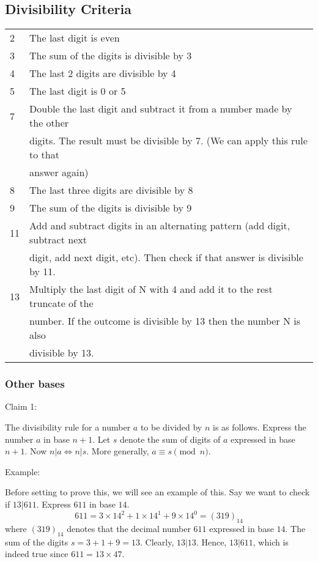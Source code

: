 \subsection{Divisibility Criteria}

\begin{table}[]
  \begin{tabular}{ll}
    2  & The last digit is even \\
    3  & The sum of the digits is divisible by 3 \\
    4  & The last 2 digits are divisible by 4 \\
    5  & The last digit is 0 or 5 \\
    7  & Double the last digit and subtract it from a number made by the other \\
       & digits. The result must be divisible by 7. (We can apply this rule to that \\
       & answer again) \\
    8  & The last three digits are divisible by 8 \\
    9  & The sum of the digits is divisible by 9 \\
    11 & Add and subtract digits in an alternating pattern (add digit, subtract next \\
       & digit, add next digit, etc). Then check if that answer is divisible by 11. \\
    13 & Multiply the last digit of N with 4 and add it to the rest truncate of the \\
       & number. If the outcome is divisible by 13 then the number N is also \\
       & divisible by 13.
  \end{tabular}
\end{table}

\subsubsection{Other bases}

Claim 1:

The divisibility rule for a number $a$ to be divided by $n$ is as follows. Express the number $a$ in base $n+1$. Let $s$ denote the sum of digits of $a$ expressed in base $n+1$. Now $n|a \iff n|s$. More generally, $a \equiv s \pmod{n}$.

Example:

Before setting to prove this, we will see an example of this. Say we want to check if $13|611$. Express $611$ in base $14$.
$$ 611 = 3 \times 14^2 + 1 \times 14^1 + 9 \times 14^0 = (319)_{14} $$
where $(319)_{14}$ denotes that the decimal number $611$ expressed in base $14$. The sum of the digits $s = 3 + 1 + 9 = 13$. Clearly, $13|13$. Hence, $13|611$, which is indeed true since $611 = 13 \times 47$.
